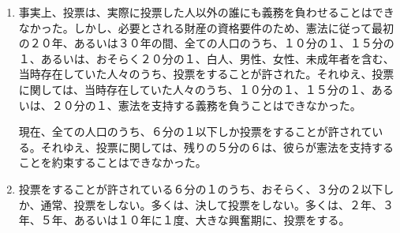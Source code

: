 \documentclass[dvipdfmx, uplatex, tate, landscape]{utbook}
\begin{document}
\begin{enumerate}
  \item 事実上、投票は、実際に投票した人以外の誰にも義務を負わせることはできなかった。しかし、必要とされる財産の資格要件のため、憲法に従って最初の２０年、あるいは３０年の間、全ての人口のうち、１０分の１、１５分の１、あるいは、おそらく２０分の１、白人、男性、女性、未成年者を含む、当時存在していた人々のうち、投票をすることが許された。それゆえ、投票に関しては、当時存在していた人々のうち、１０分の１、１５分の１、あるいは、２０分の１、憲法を支持する義務を負うことはできなかった。

  現在、全ての人口のうち、６分の１以下しか投票をすることが許されている。それゆえ、投票に関しては、残りの５分の６は、彼らが憲法を支持することを約束することはできなかった。
  \item 投票をすることが許されている６分の１のうち、おそらく、３分の２以下しか、通常、投票をしない。多くは、決して投票をしない。多くは、２年、３年、５年、あるいは１０年に１度、大きな興奮期に、投票をする。


\end{enumerate}
\end{document}
